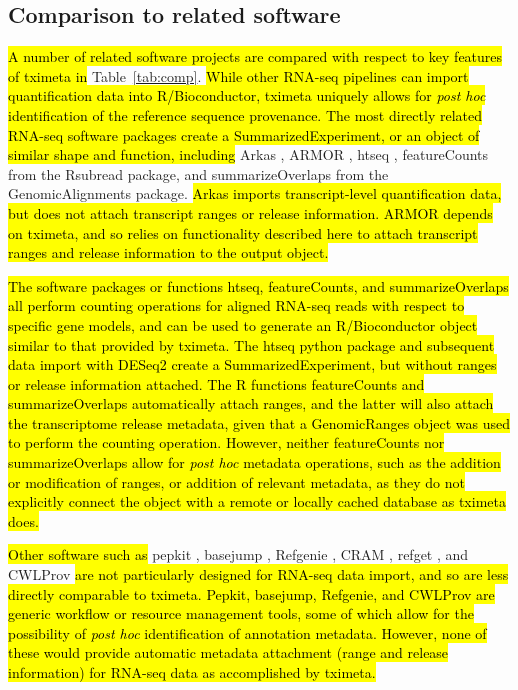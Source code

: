 \subsection*{Comparison to related software}

\hl{A number of related software projects are compared with respect to
  key features of tximeta in} Table~\ref{tab:comp}. \hl{While other
  RNA-seq pipelines can import quantification data into
  R/Bioconductor, tximeta uniquely allows for \textit{post hoc}
  identification of the reference sequence provenance.  The most
  directly related RNA-seq software packages create a
  SummarizedExperiment, or an object of similar shape and function,
  including} Arkas \cite{arkas}, ARMOR \cite{Orjuelag2019}, htseq
\cite{htseq}, featureCounts \cite{featurecounts} from the Rsubread
package, and summarizeOverlaps \cite{granges} from the
GenomicAlignments package. \hl{Arkas imports transcript-level
  quantification data, but does not attach transcript ranges or
  release information. ARMOR depends on tximeta, and so relies on
  functionality described here to attach transcript ranges and release
  information to the output object.}

\hl{The software packages or functions htseq, featureCounts, and
  summarizeOverlaps all 
  perform counting operations for aligned RNA-seq reads with
  respect to specific gene models, and can be used to generate an
  R/Bioconductor object similar to that provided by tximeta.  The
  htseq python package and subsequent data import with DESeq2 create a
  SummarizedExperiment, but without ranges or release information
  attached. The R functions featureCounts and summarizeOverlaps
  automatically attach ranges, and the latter will also attach the
  transcriptome release metadata, given that a GenomicRanges object
  was used to perform the counting operation. However, neither
  featureCounts nor summarizeOverlaps allow for \textit{post hoc}
  metadata operations, such as the addition or modification of ranges,
  or addition of relevant metadata, as they do not explicitly connect
  the object with a remote or locally cached database as tximeta
  does.}

\hl{Other software such as}
pepkit \cite{pepkit}, basejump \cite{basejump},
Refgenie \cite{refgenie},
CRAM \cite{cram}, refget \cite{refget}, and
CWLProv \cite{Khan2018}
\hl{are not particularly designed for RNA-seq data import, and so are
  less directly comparable to tximeta. Pepkit, basejump, Refgenie, and
  CWLProv are generic workflow or resource management tools, some of
  which allow for the possibility of \textit{post hoc} identification
  of annotation metadata. However, none of these would provide
  automatic metadata attachment (range and release information) for
  RNA-seq data as accomplished by tximeta.}

